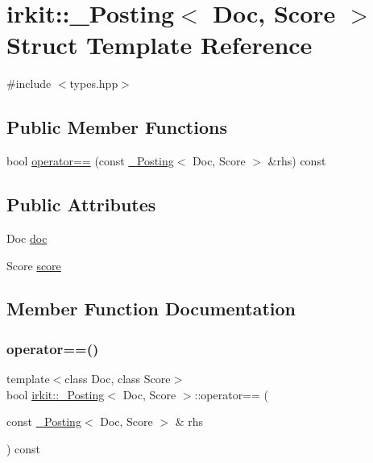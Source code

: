 \hypertarget{structirkit_1_1__Posting}{}\section{irkit\+:\+:\+\_\+\+Posting$<$ Doc, Score $>$ Struct Template Reference}
\label{structirkit_1_1__Posting}


{\ttfamily \#include $<$types.\+hpp$>$}

\subsection*{Public Member Functions}
\begin{DoxyCompactItemize}
\item 
bool \mbox{\hyperlink{structirkit_1_1__Posting_a03d7cdeee582fa17a95ffb3615276d30}{operator==}} (const \mbox{\hyperlink{structirkit_1_1__Posting}{\+\_\+\+Posting}}$<$ Doc, Score $>$ \&rhs) const
\end{DoxyCompactItemize}
\subsection*{Public Attributes}
\begin{DoxyCompactItemize}
\item 
Doc \mbox{\hyperlink{structirkit_1_1__Posting_a6ee624b39c69f2b8701701ecc8fe6a0b}{doc}}
\item 
Score \mbox{\hyperlink{structirkit_1_1__Posting_a3c5cc3b179d8fb975d3356847e34955f}{score}}
\end{DoxyCompactItemize}


\subsection{Member Function Documentation}
\mbox{\label{structirkit_1_1__Posting_a03d7cdeee582fa17a95ffb3615276d30}} 
\subsubsection{\texorpdfstring{operator==()}{operator==()}}
{\footnotesize\ttfamily template$<$class Doc, class Score$>$ \\
bool \mbox{\hyperlink{structirkit_1_1__Posting}{irkit\+::\+\_\+\+Posting}}$<$ Doc, Score $>$\+::operator== (\begin{DoxyParamCaption}\item[{const \mbox{\hyperlink{structirkit_1_1__Posting}{\+\_\+\+Posting}}$<$ Doc, Score $>$ \&}]{rhs }\end{DoxyParamCaption}) const\hspace{0.3cm}{\ttfamily [inline]}}



